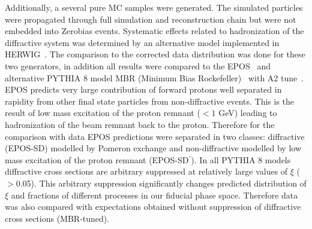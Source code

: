 Additionally, a several pure MC samples were generated. The simulated particles were propagated through full simulation and reconstruction chain but were  not embedded  into Zerobias events.   
Systematic effects related to hadronization of the diffractive system was determined by an alternative model implemented in HERWIG~\cite{Herwig:intro}. The comparison to the corrected data distribution was done for these two generators, in addition all results were compared to the EPOS~\cite{EPOS:intro} and alternative PYTHIA 8 model  MBR (Minimum Bias Rockefeller)~\cite{MBR:intro}  with A2 tune~\cite{ATLAS:A2}. EPOS predicts very large contribution of forward 
protons well separated in rapidity from other final state particles from non-diffractive events. This is the result of low mass excitation of the proton remnant ($<1$ GeV) leading to hadronization of the beam remnant back to the proton. Therefore for the comparison with data EPOS predictions were separated in two classes: diffractive (EPOS-SD) modelled by Pomeron exchange and non-diffractive modelled  by low mass excitation of the proton remnant (EPOS-SD$^\prime$).
In all PYTHIA 8 models diffractive cross sections are arbitrary suppressed at 
relatively large values of $\xi$ ($>$0.05). This arbitrary suppression significantly changes predicted distribution of $\xi$ and fractions of different processes in our fiducial phase space. Therefore data was also compared with expectations obtained without suppression of diffractive cross sections (MBR-tuned).